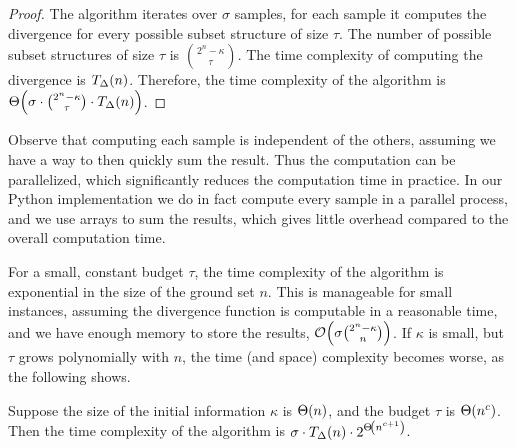\begin{proof}
  The algorithm iterates over $ \sigma $ samples, for each sample it computes the divergence for every possible subset structure of size $ \tau $.
  The number of possible subset structures of size $ \tau $ is $ \binom{2^n-\kappa}{\tau} $.
  The time complexity of computing the divergence is $ T_\Delta\!\left(n\right) $.
  Therefore, the time complexity of the \algFO{} algorithm is $ \Theta\!\left(\sigma \cdot \binom{2^n-\kappa}{\tau} \cdot T_\Delta\!\left(n\right)\right) $.
\end{proof}

Observe that computing each sample is independent of the others, assuming we have a way to then quickly sum the result.
Thus the computation can be parallelized, which significantly reduces the computation time in practice.
In our Python implementation we do in fact compute every sample in a parallel process, and we use  arrays to sum the results, which gives little overhead compared to the overall computation time.

For a small, constant budget $ \tau $, the time complexity of the \algFO{} algorithm is exponential in the size of the ground set $ n $.
This is manageable for small instances, assuming the divergence function is computable in a reasonable time, and we have enough memory to store the results, $ \mathcal{O}\!\left(\sigma \binom{2^n - \kappa}{n}\right)$.
If $ \kappa $ is small, but $ \tau $ grows polynomially with $ n $, the time (and space) complexity becomes worse, as the following  shows.

\begin{prop}[ ]
  \label{thm:algfo-time-complexity-poly-tau}
  Suppose the size of the initial information $ \kappa $ is $ \Theta\!\left(n\right) $, and the budget $ \tau $ is $ \Theta\!\left(n^c\right) $.
  Then the time complexity of the \algFO{} algorithm is $ \sigma \cdot T_\Delta\!\left(n\right) \cdot 2^{\Theta\!\left(n^{c+1}\right)}$.
\end{prop}


